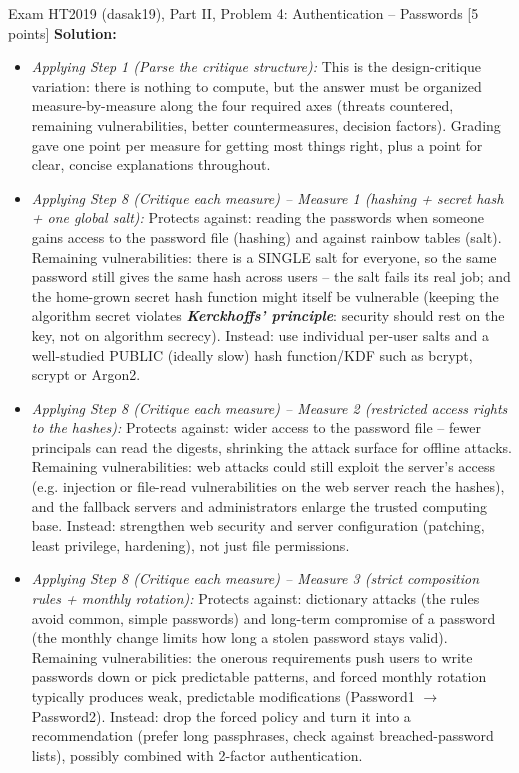 \documentclass[12pt, a4paper]{article}
\newcommand{\term}[1]{\textbf{\textit{#1}}}        %
\begin{document}
\begin{practicebox}{Exam HT2019 (dasak19), Part II, Problem 4: Authentication -- Passwords [5 points]}
\textbf{Solution:}
\begin{itemize}
    \item \textit{Applying Step 1 (Parse the critique structure):} This is the design-critique variation: there is nothing to compute, but the answer must be organized measure-by-measure along the four required axes (threats countered, remaining vulnerabilities, better countermeasures, decision factors).
    Grading gave one point per measure for getting most things right, plus a point for clear, concise explanations throughout.
    \item \textit{Applying Step 8 (Critique each measure) -- Measure 1 (hashing + secret hash + one global salt):} Protects against: reading the passwords when someone gains access to the password file (hashing) and against rainbow tables (salt).
    Remaining vulnerabilities: there is a SINGLE salt for everyone, so the same password still gives the same hash across users -- the salt fails its real job; and the home-grown secret hash function might itself be vulnerable (keeping the algorithm secret violates \term{Kerckhoffs' principle}: security should rest on the key, not on algorithm secrecy).
    Instead: use individual per-user salts and a well-studied PUBLIC (ideally slow) hash function/KDF such as bcrypt, scrypt or Argon2.
    \item \textit{Applying Step 8 (Critique each measure) -- Measure 2 (restricted access rights to the hashes):} Protects against: wider access to the password file -- fewer principals can read the digests, shrinking the attack surface for offline attacks.
    Remaining vulnerabilities: web attacks could still exploit the server's access (e.g. injection or file-read vulnerabilities on the web server reach the hashes), and the fallback servers and administrators enlarge the trusted computing base.
    Instead: strengthen web security and server configuration (patching, least privilege, hardening), not just file permissions.
    \item \textit{Applying Step 8 (Critique each measure) -- Measure 3 (strict composition rules + monthly rotation):} Protects against: dictionary attacks (the rules avoid common, simple passwords) and long-term compromise of a password (the monthly change limits how long a stolen password stays valid).
    Remaining vulnerabilities: the onerous requirements push users to write passwords down or pick predictable patterns, and forced monthly rotation typically produces weak, predictable modifications (Password1 $\rightarrow$ Password2).
    Instead: drop the forced policy and turn it into a recommendation (prefer long passphrases, check against breached-password lists), possibly combined with 2-factor authentication.

\end{itemize}
\end{practicebox}
\end{document}
